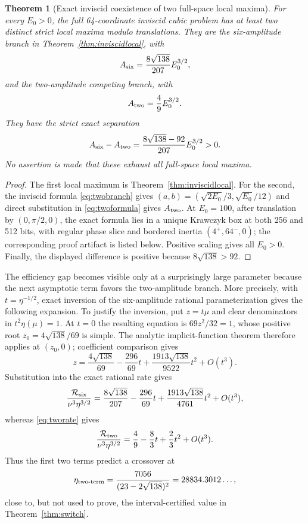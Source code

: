 \documentclass[11pt]{article}
\newtheorem{theorem}{Theorem}[section]
\newcommand{\rate}{\mathcal{R}}
\begin{document}
\begin{theorem}[Exact inviscid coexistence of two full-space local maxima]
\label{thm:inviscidcoexistence}
For every $E_0>0$, the full 64-coordinate inviscid cubic problem has at least
two distinct strict local maxima modulo translations. They are the
six-amplitude branch in Theorem~\ref{thm:inviscidlocal}, with
\[
 A_{\rm six}=\frac{8\sqrt{138}}{207}E_0^{3/2},
\]
and the two-amplitude competing branch, with
\[
 A_{\rm two}=\frac49E_0^{3/2}.
\]
They have the strict exact separation
\[
 A_{\rm six}-A_{\rm two}
 =\frac{8\sqrt{138}-92}{207}E_0^{3/2}>0.
\]
No assertion is made that these exhaust all full-space local maxima.
\end{theorem}

\begin{proof}
The first local maximum is Theorem~\ref{thm:inviscidlocal}. For the second,
the inviscid formula \eqref{eq:twobranch} gives
$(a,b)=(\sqrt{2E_0}/3,\sqrt{E_0}/12)$ and direct substitution in
\eqref{eq:twoformula} gives $A_{\rm two}$. At $E_0=100$, after translation
by $(0,\pi/2,0)$, the exact formula lies in a unique Krawczyk box at both 256
and 512 bits, with regular phase slice and bordered inertia $(4^+,64^-,0)$;
the corresponding proof artifact is listed below. Positive scaling gives all
$E_0>0$. Finally, the displayed difference is positive because
$8\sqrt{138}>92$.
\end{proof}

The efficiency gap becomes visible only at a surprisingly large parameter
because the next asymptotic term favors the two-amplitude branch.  More
precisely, with $t=\eta^{-1/2}$, exact inversion of the six-amplitude rational
parameterization gives the following expansion.  To justify the inversion,
put $z=t\mu$ and clear denominators in $t^2\eta(\mu)=1$.  At $t=0$ the
resulting equation is $69z^2/32=1$, whose positive root
$z_0=4\sqrt{138}/69$ is simple.  The analytic implicit-function theorem
therefore applies at $(z_0,0)$; coefficient comparison gives
\[
 z=\frac{4\sqrt{138}}{69}-\frac{296}{69}t
 +\frac{1913\sqrt{138}}{9522}t^2+O(t^3).
\]
Substitution into the exact rational rate gives
\[
 \frac{\rate_{\rm six}}{\nu^3\eta^{3/2}}
 =\frac{8\sqrt{138}}{207}-\frac{296}{69}t
 +\frac{1913\sqrt{138}}{4761}t^2+O(t^3),
\]
whereas \eqref{eq:tworate} gives
\[
 \frac{\rate_{\rm two}}{\nu^3\eta^{3/2}}
 =\frac49-\frac83t+\frac23t^2+O(t^3).
\]
Thus the first two terms predict a crossover at
\[
 \eta_{\rm two\text{-}term}=
 \frac{7056}{(23-2\sqrt{138})^2}=28834.3012\ldots,
\]
close to, but not used to prove, the interval-certified value in
Theorem~\ref{thm:switch}.
\end{document}
